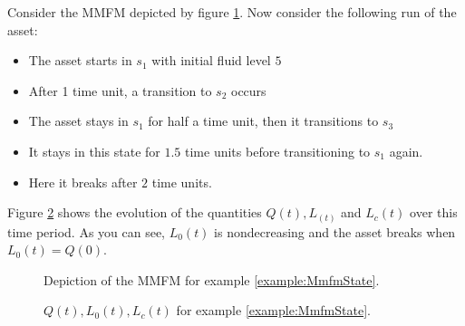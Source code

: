 \begin{example}\label{example:MmfmState}
	Consider the MMFM depicted by figure \ref{figure:MmfmExample}.
	Now consider the following run of the asset:
	\begin{itemize}
		\item The asset starts in $s_1$ with initial fluid level $5$
		\item After 1 time unit, a transition to $s_2$ occurs
		\item The asset stays in $s_1$ for half a time unit, then it transitions to $s_3$
		\item It stays in this state for $1.5$ time units before transitioning to $s_1$ again.
		\item Here it breaks after $2$ time units.
	\end{itemize}
	Figure \ref{figure:MmfmExampleQuantities} shows the evolution of the quantities $Q(t),L_(t)$ and $L_c(t)$ over this time period.
	As you can see, $L_0(t)$ is nondecreasing and the asset breaks when $L_0(t)=Q(0)$.
\end{example}
\begin{figure}
\centering
{}
\caption{Depiction of the MMFM for example \ref{example:MmfmState}.}
\label{figure:MmfmExample}
\end{figure}
\begin{figure}[H]
\centering
\setlength{}

\caption{$Q(t),L_0(t),L_c(t)$ for example \ref{example:MmfmState}.}
\label{figure:MmfmExampleQuantities}
\end{figure}


